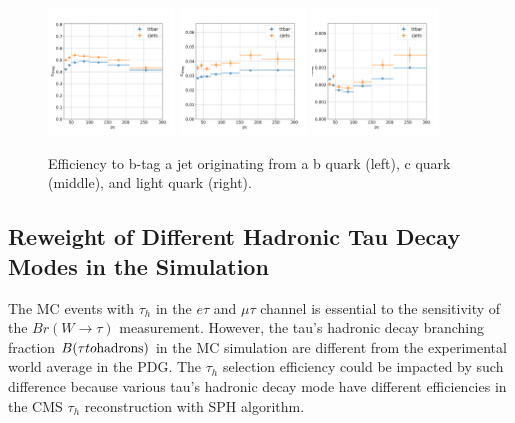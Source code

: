 \begin{figure}[h!]
    \centering
    \includegraphics[width=0.3\textwidth]{chapters/Analysis/sectionCalibration/figures/btag/bmva_mceff_vs_pt_b}
    \includegraphics[width=0.3\textwidth]{chapters/Analysis/sectionCalibration/figures/btag/bmva_mceff_vs_pt_c}
    \includegraphics[width=0.3\textwidth]{chapters/Analysis/sectionCalibration/figures/btag/bmva_mceff_vs_pt_usdg}
    \caption{Efficiency to b-tag a jet originating from a b quark (left), c quark (middle), and light quark (right).
    \label{fig:btag_eff}
    }
\end{figure}

\FloatBarrier





\subsection{Reweight of Different Hadronic Tau Decay Modes in the Simulation}
\label{sec:analysis:calibration:tauBr}

The MC events with $\tau_h$ in the $e\tau$ and $\mu \tau$ channel is essential to the sensitivity of the $Br(W\to\tau)$ measurement. However, the tau's hadronic decay branching fraction $B(\tau \to  \rm{hadrons})$ in the MC simulation are different from the experimental world average in the PDG. The $\tau_h$ selection efficiency could be impacted by such difference because various tau's hadronic  decay mode have different efficiencies in the CMS $\tau_h$ reconstruction with SPH algorithm.

